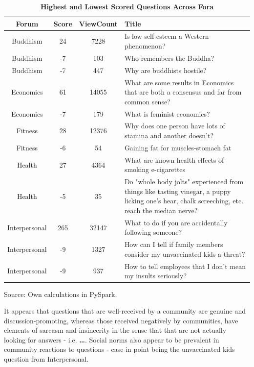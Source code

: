 \documentclass[11pt,preprint, authoryear]{article}
\numberwithin{equation}{section}
\begin{document}
\begin{longtable} {@{} cccp{11cm} @{}}
\caption{\textbf{Highest and Lowest Scored Questions Across Fora}}
\label{tab:bestworst}\\ 
\toprule
\textbf{Forum} & \textbf{Score} & \textbf{ViewCount} & \textbf{Title} \\ 
\midrule
Buddhism &     24 &       7228 &  Is low self-esteem a Western phenomenon? \\
Buddhism &     -7 &        103 &                 Who remembers the Buddha? \\
Buddhism &     -7 &        447 &                Why are buddhists hostile? \\
\hline
Economics &     61 &      14055 &  What are some results in Economics that are both a consensus and far from common sense? \\
Economics &     -7 &        179 &                                                              What is feminist economics? \\
\hline
Fitness &     28 &      12376 &  Why does one person have lots of stamina and another doesn't? \\
Fitness &     -6 &         54 &                            Gaining fat for muscles-stomach fat \\
\hline
Health &     27 &       4364 &  What are known health effects of smoking e-cigarettes \\
Health &     -5 &         35 &  Do "whole body jolts" experienced from things like tasting vinegar, a puppy licking one's hear, chalk screeching, etc. reach the median nerve? \\
\hline
Interpersonal &    265 &      32147 &                     What to do if you are accidentally following someone? \\
Interpersonal &     -9 &       1327 &  How can I tell if family members consider my unvaccinated kids a threat? \\
Interpersonal &     -9 &        937 &             How to tell employees that I don't mean my insults seriously? \\
\bottomrule
\end{longtable}\begin{center} Source: Own calculations in PySpark.\end{center}

\normalsize

It appears that questions that are well-received by a community are
genuine and discussion-promoting, whereas those received negatively by
communities, have elements of sarcasm and insincerity in the sense that
that are not actually looking for answers - i.e. \textbf{\ldots{}}.
Social norms also appear to be prevalent in community reactions to
questions - case in point being the unvaccinated kids question from
Interpersonal.
\end{document}
